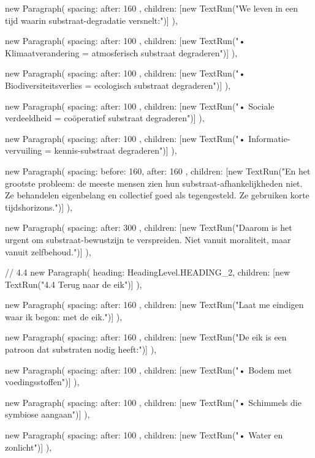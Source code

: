 {{      new Paragraph({
        spacing: { after: 160 },
        children: [new TextRun("We leven in een tijd waarin substraat-degradatie versnelt:")]
      }),

      new Paragraph({
        spacing: { after: 100 },
        children: [new TextRun("• Klimaatverandering = atmosferisch substraat degraderen")]
      }),

      new Paragraph({
        spacing: { after: 100 },
        children: [new TextRun("• Biodiversiteitsverlies = ecologisch substraat degraderen")]
      }),

      new Paragraph({
        spacing: { after: 100 },
        children: [new TextRun("• Sociale verdeeldheid = coöperatief substraat degraderen")]
      }),

      new Paragraph({
        spacing: { after: 100 },
        children: [new TextRun("• Informatie-vervuiling = kennis-substraat degraderen")]
      }),

      new Paragraph({
        spacing: { before: 160, after: 160 },
        children: [new TextRun("En het grootste probleem: de meeste mensen zien hun substraat-afhankelijkheden niet. Ze behandelen eigenbelang en collectief goed als tegengesteld. Ze gebruiken korte tijdshorizons.")]
      }),

      new Paragraph({
        spacing: { after: 300 },
        children: [new TextRun("Daarom is het urgent om substraat-bewustzijn te verspreiden. Niet vanuit moraliteit, maar vanuit zelfbehoud.")]
      }),

      // 4.4
      new Paragraph({
        heading: HeadingLevel.HEADING_2,
        children: [new TextRun("4.4 Terug naar de eik")]
      }),

      new Paragraph({
        spacing: { after: 160 },
        children: [new TextRun("Laat me eindigen waar ik begon: met de eik.")]
      }),

      new Paragraph({
        spacing: { after: 160 },
        children: [new TextRun("De eik is een patroon dat substraten nodig heeft:")]
      }),

      new Paragraph({
        spacing: { after: 100 },
        children: [new TextRun("• Bodem met voedingsstoffen")]
      }),

      new Paragraph({
        spacing: { after: 100 },
        children: [new TextRun("• Schimmels die symbiose aangaan")]
      }),

      new Paragraph({
        spacing: { after: 100 },
        children: [new TextRun("• Water en zonlicht")]
      }),

}}
